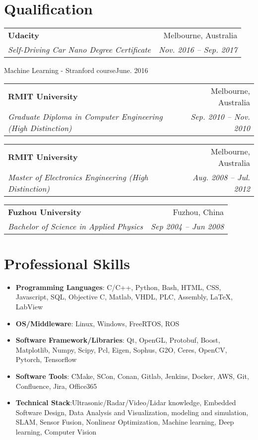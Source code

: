 \documentclass[letterpaper,11pt]{article}
\makeatletter
\newcommand{\resumeItemNoBullet}[4]{
  \vspace{-1pt}
    \begin{tabular*}{0.97\textwidth}{l@{\extracolsep{\fill}}r}
      \textbf{#1} & #2 \\
      \textit{\small#3} & \textit{\small #4} \\
    \end{tabular*}\vspace{-7pt}
}
\newcommand{\resumeSubHeadingListStart}{\begin{itemize}[leftmargin=*]}
\newcommand{\resumeSubHeadingListEnd}{\end{itemize}}
\makeatother
\begin{document}
\section{Qualification}
\resumeItemNoBullet
    {Udacity}{Melbourne, Australia}
    {Self-Driving Car Nano Degree Certificate}{Nov. 2016 -- Sep. 2017}
    {Machine Learning - Stranford course}{June. 2016}
\vspace{10pt}
\resumeItemNoBullet
    {RMIT University}{Melbourne, Australia}
    {Graduate Diploma in Computer Engineering (High Distinction)}{Sep. 2010 -- Nov. 2010}
\vspace{10pt}
\resumeItemNoBullet
    {RMIT University}{Melbourne, Australia}
    {Master of Electronics Engineering (High Distinction)}{Aug. 2008 -- Jul. 2012}
\vspace{10pt}
\resumeItemNoBullet
    {Fuzhou University}{Fuzhou, China}
    {Bachelor of Science in Applied Physics}{Sep 2004 -- Jun 2008}

\section{Professional Skills}
  \resumeSubHeadingListStart
    \item{
      \textbf{Programming Languages}{: C/C++, Python, Bash, HTML, CSS, Javascript, SQL, Objective C, Matlab, VHDL, PLC, Assembly, \LaTeX, LabView}
	}
    \item{
      \textbf{OS/Middleware}{: Linux, Windows, FreeRTOS, ROS}
  }

    \item{
      \textbf{Software Framework/Libraries}{: Qt, OpenGL, Protobuf, Boost, Matplotlib, Numpy, Scipy, Pcl, Eigen, Sophus, G2O, Ceres, OpenCV, Pytorch, Tensorflow}
  }
    \item{
      \textbf{Software Tools}{: CMake, SCon, Conan, Gitlab, Jenkins, Docker, AWS, Git, Confluence, Jira, Office365}
  }

  \item{
      \textbf{Technical Stack}{:Ultrasonic/Radar/Video/Lidar knowledge, Embedded Software Design, Data Analysis and Visualization, modeling and simulation, SLAM, Sensor Fusion, Nonlinear Optimization, Machine learning, Deep learning, Computer Vision}
  }

  \resumeSubHeadingListEnd

\end{document}
